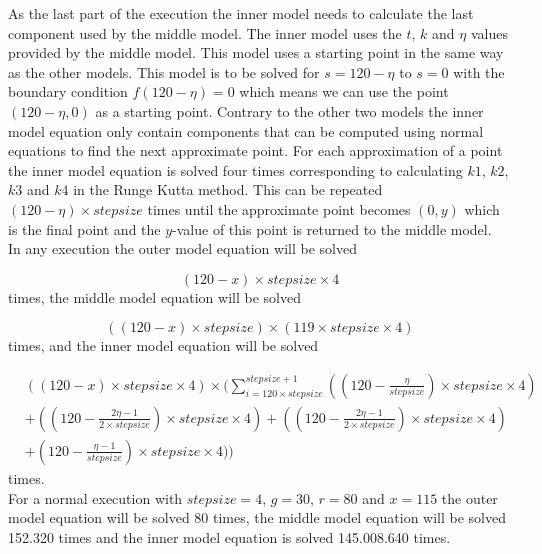 	As the last part of the execution the inner model needs to calculate the last component used by the middle model. The inner model uses the $t$, $k$ and $\eta$ values provided by the middle model. This model uses a starting point in the same way as the other models. This model is to be solved for $s = 120 - \eta$ to $s=0$ with the boundary condition $f(120 - \eta) = 0$ which means we can use the point $(120-\eta,0)$ as a starting point. Contrary to the other two models the inner model equation only contain components that can be computed using normal equations to find the next approximate point. For each approximation of a point the inner model equation is solved four times corresponding to calculating $k1$, $k2$, $k3$ and $k4$ in the Runge Kutta method. This can be repeated $(120 - \eta) \times stepsize$ times until the approximate point becomes $(0,y)$ which is the final point and the $y$-value of this point is returned to the middle model. \\ 
	
	In any execution the outer model equation will be solved 
	
	\begin{equation}
	(120-x) \times stepsize \times 4
	\end{equation} times, the middle model equation will be solved 
	
	\begin{equation}
	((120-x) \times stepsize) \times (119 \times stepsize \times 4)
	\end{equation} times, and the inner model equation will be solved 
	
	\begin{align}
 \nonumber&((120-x) \times stepsize \times 4) \times  
	(\sum\limits_{i=120 \times stepsize}^{stepsize+1} 
	( 
	(120 - \frac{\eta}{stepsize}) \times stepsize \times 4) \\ \nonumber & + 
	((120 - \frac{2\eta - 1}{2 \times stepsize})\times stepsize \times 4) + 
	((120 - \frac{2\eta - 1}{2 \times stepsize})\times stepsize \times 4) \\& +
	(120 - \frac{\eta-1}{stepsize}) \times stepsize \times 4)
	)
	\end{align} times.\\
	
	For a normal execution with $stepsize=4$, $g=30$, $r=80$ and $x=115$ the outer model equation will be solved 80 times, the middle model equation will be solved 152.320 times and the inner model equation is solved 145.008.640 times.
